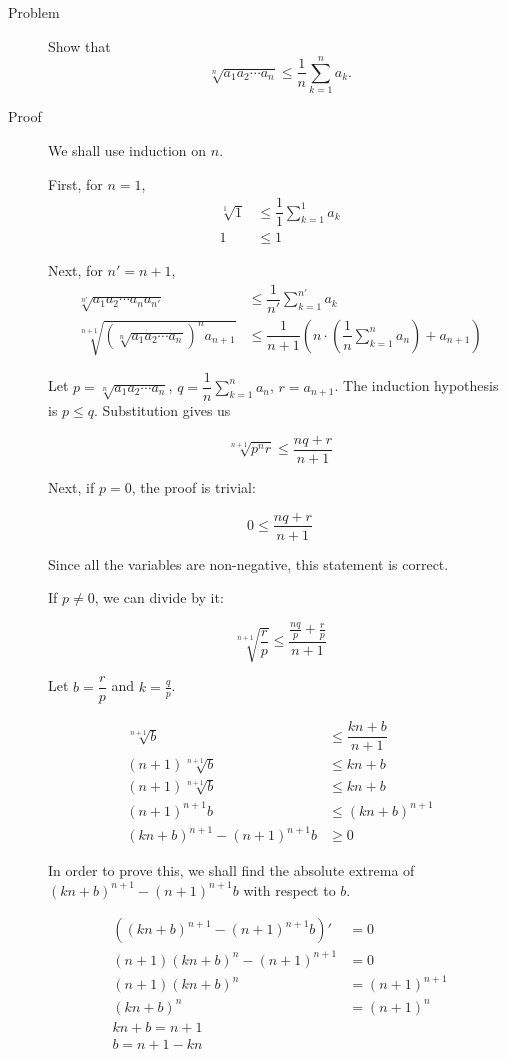 \begin{description}
\item[Problem] Show that
$$\sqrt[n]{a_1 a_2 \cdots a_n} \le \dfrac 1 n \sum\limits_{k = 1}^n a_k.$$

\item[Proof] We shall use induction on $n$.

First, for $n = 1$,
\begin{align*}
\sqrt[1]{1} &\le \dfrac 1 1 \sum\limits_{k = 1}^1 a_k \\
1 &\le 1
\end{align*}

Next, for $n' = n + 1$,
\begin{align*}
\sqrt[n']{a_1 a_2 \cdots a_n a_{n'}} &\le
\dfrac 1 {n'} \sum\limits_{k = 1}^{n'} a_k \\
\sqrt[n+1]{\left(\sqrt[n]{a_1 a_2 \cdots a_n}\right)^n a_{n+1}} &\le
\dfrac 1 {n+1} \left(n \cdot \left(\dfrac 1 n \sum\limits_{k=1}^n a_n\right) +
a_{n+1}\right)
\end{align*}

Let $p = \sqrt[n]{a_1 a_2 \cdots a_n}$, $q = \dfrac 1 n \sum\limits_{k=1}^n
a_n$, $r = a_{n+1}$. The induction hypothesis is $p \le q$. Substitution gives
us

$$\sqrt[n+1]{p^n r} \le \dfrac{nq + r}{n + 1}$$

Next, if $p = 0$, the proof is trivial:

$$0 \le \dfrac{nq + r}{n + 1}$$

Since all the variables are non-negative, this statement is correct.

If $p \ne 0$, we can divide by it:

$$\sqrt[n+1]{\dfrac{r}{p}} \le \dfrac{\frac{nq}{p} + \frac{r}{p}}{n+1}$$

Let $b = \dfrac r p$ and $k = \frac q p$.

\begin{align*}
\sqrt[n+1] b &\le \dfrac{kn + b}{n+1} \\
(n+1) \sqrt[n+1] b &\le kn + b \\
(n+1) \sqrt[n+1] b &\le kn + b \\
(n+1)^{n+1} b &\le (kn + b)^{n+1} \\
(kn + b)^{n+1} - (n+1)^{n+1} b &\ge 0
\end{align*}

In order to prove this, we shall find the absolute extrema of $(kn + b)^{n+1} -
(n+1)^{n+1} b$ with respect to $b$.

\begin{align*}
\left((kn + b)^{n+1} - (n+1)^{n+1} b\right)' &= 0 \\
(n+1) (kn+b)^n - (n+1)^{n+1} &= 0 \\
(n+1) (kn+b)^n &= (n+1)^{n+1} \\
(kn +b)^n &= (n+1)^n \\
kn + b = n + 1 \\
b = n + 1 - kn
\end{align*}


\end{description}
